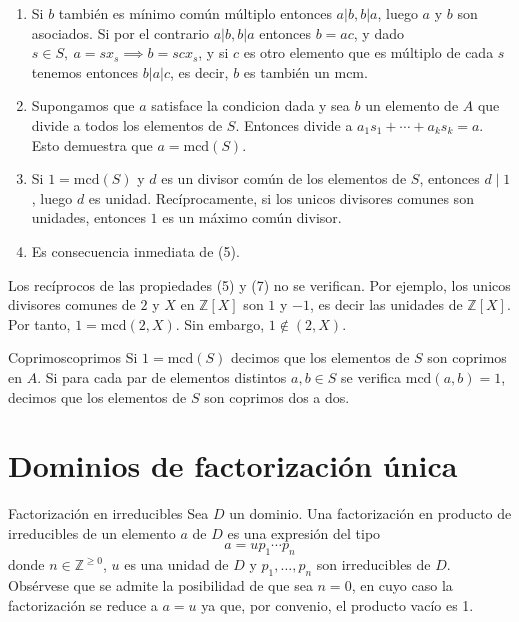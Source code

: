 \begin{proofbox}
\begin{enumerate}
\item Si $b$ también es mínimo común múltiplo entonces $a | b, b | a$, luego $a$ y $b$ son asociados. Si por el contrario $a | b, b | a$ entonces $b = ac$, y dado $s \in S,\ a = sx_s \implies b = scx_s$, y si $c$ es otro elemento que es múltiplo de cada $s$ tenemos entonces $b | a | c$, es decir, $b$ es también un $\text{mcm}$.

\item Supongamos que \(a\) satisface la condicion dada y sea \(b\) un elemento de \(A\) que divide a todos los elementos de \(S\). Entonces divide a \(a_1 s_1 + \cdots + a_k s_k = a\). Esto demuestra que \(a = \mathrm{mcd}(S)\).

\item Si \(1 = \mathrm{mcd}(S)\) y \(d\) es un divisor común de los elementos de \(S\), entonces \(d \mid 1\), luego \(d\) es unidad. Recíprocamente, si los unicos divisores comunes son unidades, entonces \(1\) es un máximo común divisor.

\item Es consecuencia inmediata de (5).
\end{enumerate}

\end{proofbox}

\begin{example}{}{}
Los recíprocos de las propiedades (5) y (7) no se verifican. Por ejemplo, los unicos divisores comunes de \(2\) y \(X\) en \(\mathbb{Z}[X]\) son \(1\) y \(-1\), es decir las unidades de \(\mathbb{Z}[X]\). Por tanto, \(1 = \mathrm{mcd}(2,X)\). Sin embargo, \(1 \not\in (2,X)\).
\end{example}

\begin{definition}{Coprimos}{coprimos}
Si \(1 = \mathrm{mcd}(S)\) decimos que los elementos de \(S\) son coprimos en \(A\). Si para cada par de elementos distintos \(a, b \in S\) se verifica \(\mathrm{mcd}(a,b) = 1\), decimos que los elementos de \(S\) son coprimos dos a dos.
\end{definition}

\clearpage
\section{Dominios de factorización única}

\begin{definition}{Factorización en irreducibles}{}
Sea \(D\) un dominio. Una factorización en producto de irreducibles de un elemento \(a\) de \(D\) es una expresión del tipo
\[
a = u p_1 \cdots p_n
\]
donde \(n \in \mathbb{Z}^{\geq 0}\), \(u\) es una unidad de \(D\) y \(p_1, \ldots, p_n\) son irreducibles de \(D\). Obsérvese que se admite la posibilidad de que sea $n = 0$, en cuyo caso la factorización se reduce a $a = u$ ya que, por convenio, el producto vacío es 1.
\end{definition}

